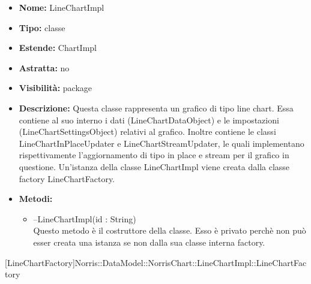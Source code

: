 			
			\begin{itemize}
			\item \textbf{Nome:} LineChartImpl
			\item \textbf{Tipo:} classe
			
		\item \textbf{Estende:}
		ChartImpl
		\item \textbf{Astratta:}
		no
			\item \textbf{Visibilità:} package
			\item \textbf{Descrizione:} Questa classe rappresenta un grafico di tipo line chart. Essa contiene al suo interno i dati (LineChartDataObject) e le impostazioni (LineChartSettingsObject) relativi al grafico. Inoltre contiene le classi LineChartInPlaceUpdater e LineChartStreamUpdater, le quali implementano rispettivamente l'aggiornamento di tipo in place e stream per il grafico in questione. Un'istanza della classe LineChartImpl viene creata dalla classe factory LineChartFactory.
			\item \textbf{Metodi:}
				\begin{itemize}
				\setlength{\itemsep}{5pt}
				
					\item[\ding{111}] {{--LineChartImpl(id : String)}} \\ [1mm] Questo metodo è il costruttore della classe. Esso è privato perchè non può esser creata una istanza se non dalla sua classe interna factory.
				\end{itemize}
		
			\end{itemize}

			
			[LineChartFactory]{Norris::DataModel::NorrisChart::LineChartImpl::LineChartFactory}
			

	
